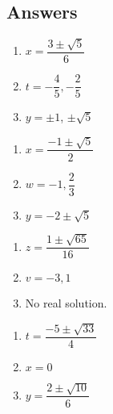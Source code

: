 \documentclass{ximera}
\begin{document}
\newpage

\subsection{Answers}

\begin{multicols}{3}
\begin{enumerate}

\item  $x = \dfrac{3 \pm \sqrt{5}}{6}$ 
\item  $t = -\dfrac{4}{5}, -\dfrac{2}{5}$ 
\item  $y = \pm 1$, $\pm \sqrt{5}$ 

\setcounter{HW}{\value{enumi}}
\end{enumerate}
\end{multicols}

\begin{multicols}{3}
\begin{enumerate}
\setcounter{enumi}{\value{HW}}

\item $x = \dfrac{-1 \pm \sqrt{5}}{2}$
\item $w = -1, \dfrac{2}{3}$ 
\item $y = -2 \pm \sqrt{5}$

\setcounter{HW}{\value{enumi}}
\end{enumerate}
\end{multicols}

\begin{multicols}{3}
\begin{enumerate}
\setcounter{enumi}{\value{HW}}

\item $z = \dfrac{1 \pm \sqrt{65}}{16}$
\item  $v = -3, 1$
\item No real solution.

\setcounter{HW}{\value{enumi}}
\end{enumerate}
\end{multicols}

\begin{multicols}{3}
\begin{enumerate}
\setcounter{enumi}{\value{HW}}

\item $t = \dfrac{-5 \pm \sqrt{33}}{4}$
\item $x = 0$ 
\item $y = \dfrac{2 \pm \sqrt{10}}{6}$

\setcounter{HW}{\value{enumi}}
\end{enumerate}
\end{multicols}
\end{document}
